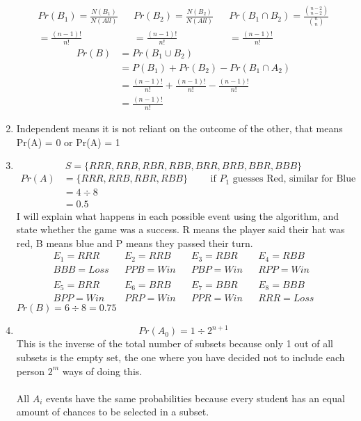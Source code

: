 \documentclass{article}
\begin{document}
\begin{enumerate}
			\begin{align*}
				Pr(B_1) = \frac{N(B_1)}{N(All)} && Pr(B_2) = \frac{N(B_2)}{N(All)} && Pr(B_1 \cap B_2) = \frac{\binom{n - 2}{n - 2}}{\binom{n}{n}} \\
				= \frac{(n - 1)!}{n!} && = \frac{(n - 1)!}{n!} && = \frac{(n - 1)!}{n!}
			\end{align*}
			\begin{align*}
				Pr(B) &= Pr(B_1 \cup B_2) \\
				&= P(B_1) + Pr(B_2) - Pr(B_1 \cap A_2) \\
				&= \frac{(n - 1)!}{n!} + \frac{(n - 1)!}{n!} - \frac{(n - 1)!}{n!}\\
				&= \frac{(n - 1)!}{n!}
			\end{align*}
		\item %
			 Independent means it is not reliant on the outcome of the other, that means Pr(A) = 0 or Pr(A) = 1
		\item %
			\[S = \{RRR, RRB, RBR, RBB, BRR, BRB, BBR, BBB\} \]
			\begin{align*}
				Pr(A) &= \{RRR, RRB, RBR, RBB\} \qquad \text{ if $P_1$ guesses Red, similar for Blue}\\
				&= 4 \div 8 \\
				&= 0.5
			\end{align*}
			I will explain what happens in each possible event using the algorithm, and state whether the game was a success.
			R means the player said their hat was red, B means blue and P means they passed their turn.
			\begin{align*}
				E_1 = RRR && E_2 = RRB && E_3 = RBR && E_4 = RBB \\
				BBB = Loss && PPB = Win && PBP = Win && RPP = Win\\
				\\
				E_5 = BRR && E_6 = BRB && E_7 = BBR && E_8 = BBB \\
				BPP = Win && PRP = Win && PPR = Win && RRR = Loss
			\end{align*}
			$Pr(B) = 6 \div 8 = 0.75$
		\item %
			\[
				Pr(A_0) = 1 \div 2^{n + 1}
			\]
			This is the inverse of the total number of subsets because only 1 out of all subsets is the empty set, the one where you have decided not to include each person $2^m$ ways of doing this.
			\\ \\
			All $A_i$ events have the same probabilities because every student has an equal amount of chances to be selected in a subset.

\end{enumerate}
\end{document}
